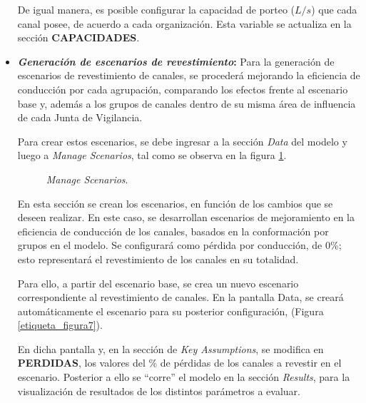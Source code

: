 \documentclass[]{article}
\begin{document}
\begin{itemize}
De igual manera, es posible configurar la capacidad de porteo ($L/s$) que cada canal posee, de acuerdo a cada organización. Esta variable se actualiza en la sección \textbf{CAPACIDADES}.

\item \textbf{\textit{Generación de escenarios de revestimiento}:} Para la generación de escenarios de revestimiento de canales, se procederá mejorando la eficiencia de conducción por cada agrupación, comparando los efectos frente al escenario base y, además a los grupos de canales dentro de su misma área de influencia de cada Junta de Vigilancia.

Para crear estos escenarios, se debe ingresar a la sección \textit{Data} del modelo y luego a \textit{Manage Scenarios}, tal como se observa en la figura \ref{etiqueta_figura6}.

\begin{figure}[H]
\begin{center}
\caption{\textit{Manage Scenarios}.}
\label{etiqueta_figura6}
\end{center}
\end{figure}

En esta sección se crean los escenarios, en función de los cambios que se deseen realizar. En este caso, se desarrollan escenarios de mejoramiento en la eficiencia de conducción de los canales, basados en la conformación por grupos en el modelo. Se configurará como pérdida por conducción, de 0\%; esto representará el revestimiento de los canales en su totalidad.

Para ello, a partir del escenario base, se crea un nuevo escenario correspondiente al revestimiento de canales. En la pantalla Data, se creará automáticamente el escenario para su posterior configuración, (Figura \ref{etiqueta_figura7}).

En dicha pantalla y, en la sección de \textit{Key Assumptions}, se modifica en \textbf{PERDIDAS}, los valores del \% de pérdidas de los canales a revestir en el escenario. Posterior a ello se “corre” el modelo en la sección \textit{Results}, para la visualización de resultados de los distintos parámetros a evaluar. 


\end{itemize}
\end{document}
